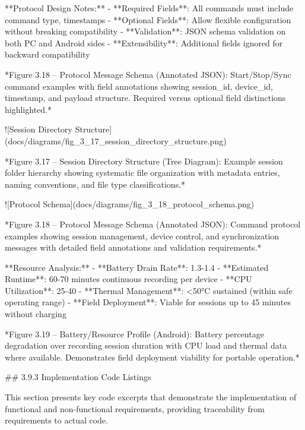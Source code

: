 \documentclass[12pt,a4paper]{article}
\begin{document}
**Protocol Design Notes:**
- **Required Fields**: All commands must include command type, timestamps
- **Optional Fields**: Allow flexible configuration without breaking compatibility
- **Validation**: JSON schema validation on both PC and Android sides
- **Extensibility**: Additional fields ignored for backward compatibility

*Figure 3.18 – Protocol Message Schema (Annotated JSON): Start/Stop/Sync command examples with field annotations showing session_id, device_id, timestamp, and payload structure. Required versus optional field distinctions highlighted.*

![Session Directory Structure](docs/diagrams/fig_3_17_session_directory_structure.png)

*Figure 3.17 – Session Directory Structure (Tree Diagram): Example session folder hierarchy showing systematic file organization with metadata entries, naming conventions, and file type classifications.*

![Protocol Schema](docs/diagrams/fig_3_18_protocol_schema.png)

*Figure 3.18 – Protocol Message Schema (Annotated JSON): Command protocol examples showing session management, device control, and synchronization messages with detailed field annotations and validation requirements.*

**Resource Analysis:**
- **Battery Drain Rate**: 1.3-1.4%
- **Estimated Runtime**: 60-70 minutes continuous recording per device
- **CPU Utilization**: 25-40%
- **Thermal Management**: <50°C sustained (within safe operating range)
- **Field Deployment**: Viable for sessions up to 45 minutes without charging

*Figure 3.19 – Battery/Resource Profile (Android): Battery percentage degradation over recording session duration with CPU load and thermal data where available. Demonstrates field deployment viability for portable operation.*

## 3.9.3 Implementation Code Listings

This section presents key code excerpts that demonstrate the implementation of functional and non-functional requirements, providing traceability from requirements to actual code.
\end{document}
